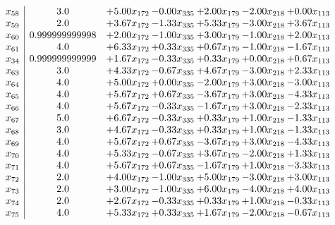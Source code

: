 \documentclass[8pt]{article}
\begin{document}
\[\begin{array}{c| c c@{\hskip 2pt} c@{\hskip 2pt} c@{\hskip 2pt} c@{\hskip 2pt} c@{\hskip 2pt} }
 x_{58}   &  3.0 & +  5.00 x_{172} & -0.00 x_{335} & +  2.00 x_{179} & -2.00 x_{218} & +  0.00 x_{113}\\
 x_{59}   &  2.0 & +  3.67 x_{172} & -1.33 x_{335} & +  5.33 x_{179} & -3.00 x_{218} & +  3.67 x_{113}\\
 x_{60}   &  0.999999999998 & +  2.00 x_{172} & -1.00 x_{335} & +  3.00 x_{179} & -1.00 x_{218} & +  2.00 x_{113}\\
 x_{61}   &  4.0 & +  6.33 x_{172} & +  0.33 x_{335} & +  0.67 x_{179} & -1.00 x_{218} & -1.67 x_{113}\\
 x_{34}   &  0.999999999999 & +  1.67 x_{172} & -0.33 x_{335} & +  0.33 x_{179} & +  0.00 x_{218} & +  0.67 x_{113}\\
 x_{63}   &  3.0 & +  4.33 x_{172} & -0.67 x_{335} & +  4.67 x_{179} & -3.00 x_{218} & +  2.33 x_{113}\\
 x_{64}   &  4.0 & +  5.00 x_{172} & +  0.00 x_{335} & -2.00 x_{179} & +  3.00 x_{218} & -3.00 x_{113}\\
 x_{65}   &  4.0 & +  5.67 x_{172} & +  0.67 x_{335} & -3.67 x_{179} & +  3.00 x_{218} & -4.33 x_{113}\\
 x_{66}   &  4.0 & +  5.67 x_{172} & -0.33 x_{335} & -1.67 x_{179} & +  3.00 x_{218} & -2.33 x_{113}\\
 x_{67}   &  5.0 & +  6.67 x_{172} & -0.33 x_{335} & +  0.33 x_{179} & +  1.00 x_{218} & -1.33 x_{113}\\
 x_{68}   &  3.0 & +  4.67 x_{172} & -0.33 x_{335} & +  0.33 x_{179} & +  1.00 x_{218} & -1.33 x_{113}\\
 x_{69}   &  4.0 & +  5.67 x_{172} & +  0.67 x_{335} & -3.67 x_{179} & +  3.00 x_{218} & -4.33 x_{113}\\
 x_{70}   &  4.0 & +  5.33 x_{172} & -0.67 x_{335} & +  3.67 x_{179} & -2.00 x_{218} & +  1.33 x_{113}\\
 x_{71}   &  4.0 & +  5.67 x_{172} & +  0.67 x_{335} & -1.67 x_{179} & +  1.00 x_{218} & -3.33 x_{113}\\
 x_{72}   &  2.0 & +  4.00 x_{172} & -1.00 x_{335} & +  5.00 x_{179} & -3.00 x_{218} & +  3.00 x_{113}\\
 x_{73}   &  2.0 & +  3.00 x_{172} & -1.00 x_{335} & +  6.00 x_{179} & -4.00 x_{218} & +  4.00 x_{113}\\
 x_{74}   &  2.0 & +  2.67 x_{172} & -0.33 x_{335} & +  0.33 x_{179} & +  1.00 x_{218} & -0.33 x_{113}\\
 x_{75}   &  4.0 & +  5.33 x_{172} & +  0.33 x_{335} & +  1.67 x_{179} & -2.00 x_{218} & -0.67 x_{113}\\

\end{array}\]
\end{document}
